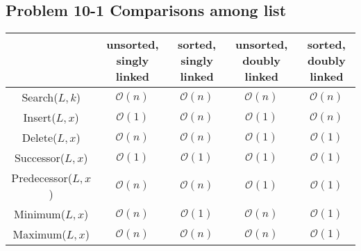 \subsection*{Problem 10-1 Comparisons among list}
\begin{lrbox}{\tablebox}
	\begin{tabular}{c | c | c | c | c |}
		 & unsorted, singly linked & sorted, singly linked & unsorted, doubly linked & sorted, doubly linked  \\\hline
		Search($L, k$) & $\mathcal{O}(n)$ & $\mathcal{O}(n)$ & $\mathcal{O}(n)$ & $\mathcal{O}(n)$  \\\hline
		Insert($L, x$) & $\mathcal{O}(1)$ & $\mathcal{O}(n)$ & $\mathcal{O}(1)$ & $\mathcal{O}(n)$  \\\hline
		Delete($L, x$) & $\mathcal{O}(n)$ & $\mathcal{O}(n)$ & $\mathcal{O}(1)$ & $\mathcal{O}(1)$  \\\hline
		Successor($L, x$) & $\mathcal{O}(1)$ & $\mathcal{O}(1)$ & $\mathcal{O}(1)$ & $\mathcal{O}(1)$  \\\hline
		Predecessor($L, x$) & $\mathcal{O}(n)$ & $\mathcal{O}(n)$ & $\mathcal{O}(1)$ & $\mathcal{O}(1)$  \\\hline
		Minimum($L, x$) & $\mathcal{O}(n)$ & $\mathcal{O}(1)$ & $\mathcal{O}(n)$ & $\mathcal{O}(1)$  \\\hline
		Maximum($L, x$) & $\mathcal{O}(n)$ & $\mathcal{O}(n)$ & $\mathcal{O}(n)$ & $\mathcal{O}(1)$  \\\hline
	\end{tabular}
\end{lrbox}

\begin{center}
\resizebox{1.2\textwidth}{!}{\usebox{\tablebox}}
\end{center}

